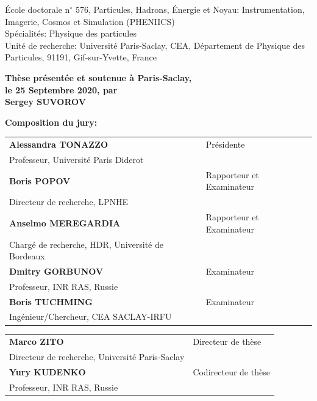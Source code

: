 \documentclass[../main.tex]{subfiles}
\begin{document}
\vspace{15mm}

École doctorale n$^{\circ}$ 576, Particules, Hadrons, Énergie et Noyau: Instrumentation,
Imagerie, Cosmos et Simulation (PHENIICS)\\
\small Spécialités: Physique des particules\\
\footnotesize Unité de recherche: Université Paris-Saclay, CEA, Département de Physique des Particules, 91191, Gif-sur-Yvette, France
\vspace{15mm}

\textbf{Thèse présentée et soutenue à Paris-Saclay, \\ le 25 Septembre 2020, par}\\
\bigskip
\Large {\color{Prune} \textbf{Sergey SUVOROV}}


\vspace{\fill} %

\flushleft \small \textbf{Composition du jury:}
\bigskip



\scriptsize
\begin{tabular}{|p{8cm}l}
\textbf{Alessandra TONAZZO} &  Présidente \\
Professeur, Université Paris Diderot   &   \\

\textbf{Boris POPOV} &   Rapporteur et Examinateur \\
Directeur de recherche, LPNHE & \\
\textbf{Anselmo MEREGARDIA} &  Rapporteur et Examinateur \\
Chargé de recherche, HDR, Université de Bordeaux  &   \\


\textbf{Dmitry GORBUNOV} &  Examinateur \\
Professeur, INR RAS, Russie   &   \\
\textbf{Boris TUCHMING} &  Examinateur \\
Ingénieur/Chercheur, CEA SACLAY-IRFU   &   \\

\end{tabular}

\medskip
\begin{tabular}{|p{8cm}l}\arrayrulecolor{white}
\textbf{Marco ZITO} &   Directeur de thèse \\
Directeur de recherche, Université Paris-Saclay & \\
\textbf{Yury KUDENKO} &   Codirecteur de thèse \\
Professeur, INR RAS, Russie  &   \\


\end{tabular}
\end{document}
